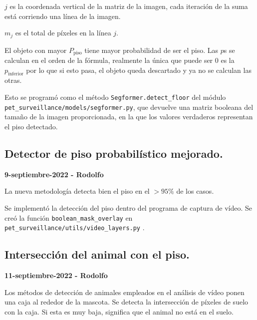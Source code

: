 $j$ es la coordenada vertical de la matriz de la imagen, cada iteración de la suma está corriendo una línea de la imagen.

$m_j$ es el total de píxeles en la línea $j$.


El objeto con mayor $P_{\text{piso}}$ tiene mayor probabilidad de ser el piso. Las $p$s se calculan en el orden de la fórmula, realmente la única que puede ser 0 es la $p_\text{{inferior}}$ por lo que si esto pasa, el objeto queda descartado y ya no se calculan las otras. 

Esto se programó como el método \texttt{Segformer.detect\_floor} del módulo \texttt{pet\_surveillance/models/segformer.py}, que devuelve una matriz booleana del tamaño de la imagen proporcionada, en la que los valores verdaderos representan el piso detectado.


\subsection*{Detector de piso probabilístico mejorado.}

\textbf{9-septiembre-2022 - Rodolfo}

La nueva metodología detecta bien el piso en el $>95\%$ de los casos. 

Se implementó la detección del piso dentro del programa de captura de vídeo. Se creó la función \texttt{boolean\_mask\_overlay} en \texttt{pet\_surveillance/utils/video\_layers.py} .

\subsection*{Intersección del animal con el piso.}
\textbf{11-septiembre-2022 - Rodolfo}

Los métodos de detección de animales empleados en el análisis de vídeo ponen una caja al rededor de la mascota. Se detecta la intersección de píxeles de suelo con la caja. Si esta es muy baja, significa que el animal no está en el suelo.



